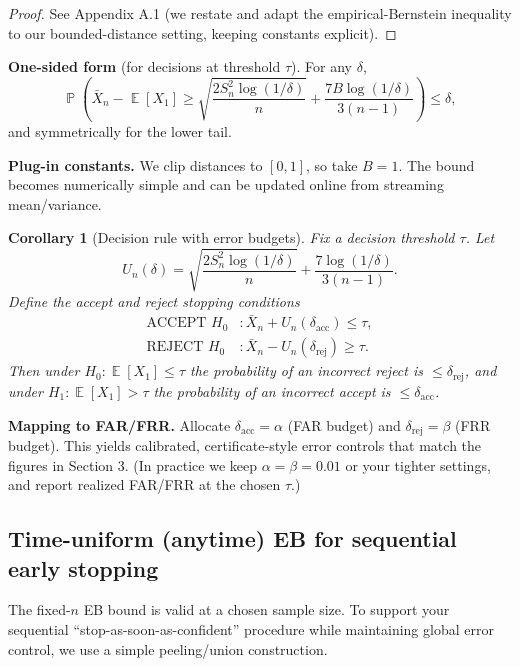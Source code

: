 \documentclass[11pt]{article}
\newtheorem{corollary}[theorem]{Corollary}
\DeclareMathOperator{\E}{\mathbb{E}}
\DeclareMathOperator{\Prob}{\mathbb{P}}
\begin{document}
\begin{proof}
See Appendix A.1 (we restate and adapt the empirical-Bernstein inequality to our bounded-distance setting, keeping constants explicit).
\end{proof}

\textbf{One-sided form} (for decisions at threshold $\tau$). For any $\delta$,
\begin{equation}
\Prob\left(\bar{X}_n - \E[X_1] \ge \sqrt{\frac{2 S_n^2 \log(1/\delta)}{n}} + \frac{7B\log(1/\delta)}{3(n-1)}\right) \le \delta,
\end{equation}
and symmetrically for the lower tail.

\textbf{Plug-in constants.} We clip distances to $[0,1]$, so take $B=1$. The bound becomes numerically simple and can be updated online from streaming mean/variance.

\begin{corollary}[Decision rule with error budgets]
\label{cor:decision}
Fix a decision threshold $\tau$. Let
\begin{equation}
U_n(\delta) = \sqrt{\frac{2 S_n^2 \log(1/\delta)}{n}} + \frac{7\log(1/\delta)}{3(n-1)}.
\end{equation}
Define the accept and reject stopping conditions
\begin{align}
\text{ACCEPT } H_0 &: \bar{X}_n + U_n(\delta_{\text{acc}}) \le \tau,\\
\text{REJECT } H_0 &: \bar{X}_n - U_n(\delta_{\text{rej}}) \ge \tau.
\end{align}
Then under $H_0:\E[X_1]\le \tau$ the probability of an incorrect reject is $\le \delta_{\text{rej}}$, and under $H_1:\E[X_1]>\tau$ the probability of an incorrect accept is $\le \delta_{\text{acc}}$.
\end{corollary}

\textbf{Mapping to FAR/FRR.} Allocate $\delta_{\text{acc}}=\alpha$ (FAR budget) and $\delta_{\text{rej}}=\beta$ (FRR budget). This yields calibrated, certificate-style error controls that match the figures in Section 3. (In practice we keep $\alpha=\beta=0.01$ or your tighter settings, and report realized FAR/FRR at the chosen $\tau$.)

\subsection{Time-uniform (anytime) EB for sequential early stopping}

The fixed-$n$ EB bound is valid at a chosen sample size. To support your sequential ``stop-as-soon-as-confident'' procedure while maintaining global error control, we use a simple peeling/union construction.
\end{document}
